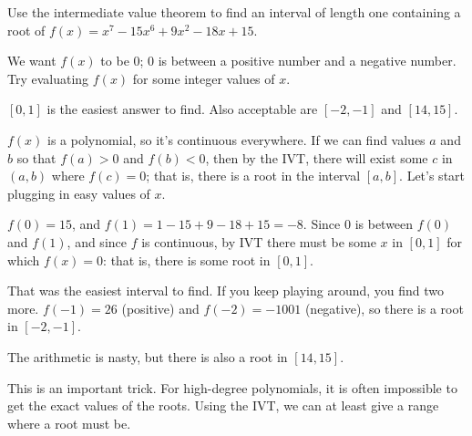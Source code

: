 \begin{question}Use the intermediate value theorem to find an interval of length one containing a root of $f(x)=x^7-15x^6+9x^2-18x+15$.
\end{question}
\begin{hint} We want $f(x)$ to be 0; 0 is between a positive number and a negative number. Try evaluating $f(x)$ for some integer values of $x$.
\end{hint}
\begin{answer} $[0,1]$ is the easiest answer to find. Also acceptable are $[-2,-1]$ and $[14,15]$.
\end{answer}
\begin{solution} $f(x)$ is a polynomial, so it's continuous everywhere. If we can find values $a$ and $b$ so that $f(a)>0$ and $f(b)<0$, then by the IVT, there will exist some $c$ in $(a,b)$ where $f(c)=0$; that is, there is a root in the interval $[a,b]$. Let's start plugging in easy values of $x$.

$f(0)=15$, and $f(1)=1-15+9-18+15=-8$. Since 0 is between $f(0)$ and $f(1)$, and since $f$ is continuous, by IVT there must be some $x$ in $[0,1]$ for which $f(x)=0$: that is, there is some root in $[0,1]$.

That was the easiest interval to find. If you keep playing around, you find two more. $f(-1)=26$ (positive) and $f(-2)=-1001$ (negative), so there is a root in $[-2,-1]$.

The arithmetic is nasty, but there is also a root in $[14,15]$.

This is an important trick. For high-degree polynomials, it is often impossible to get the exact values of the roots. Using the IVT, we can at least give a range where a root must be.
\end{solution}


